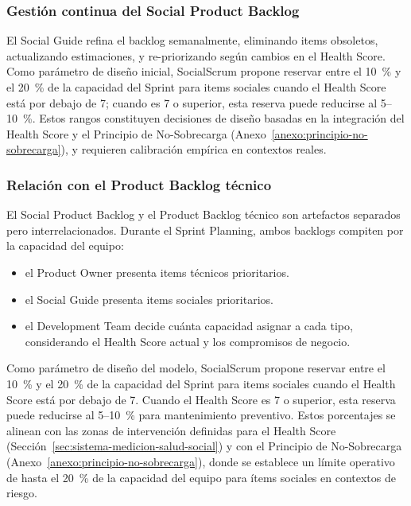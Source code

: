 \subsubsection{Gestión continua del Social Product Backlog}

El Social Guide refina el backlog semanalmente, eliminando items obsoletos, actualizando estimaciones, y re-priorizando según cambios en el Health Score. Como parámetro de diseño inicial, SocialScrum propone reservar entre el 10~\% y el 20~\% de la capacidad del Sprint para items sociales cuando el Health Score está por debajo de 7; cuando es 7 o superior, esta reserva puede reducirse al 5--10~\%. Estos rangos constituyen decisiones de diseño basadas en la integración del Health Score y el Principio de No-Sobrecarga (Anexo~\ref{anexo:principio-no-sobrecarga}), y requieren calibración empírica en contextos reales.

\subsubsection{Relación con el Product Backlog técnico}

El Social Product Backlog y el Product Backlog técnico son artefactos separados pero interrelacionados. Durante el Sprint Planning, ambos backlogs compiten por la capacidad del equipo:

\begin{itemize}
    \item el Product Owner presenta items técnicos prioritarios.
    \item el Social Guide presenta items sociales prioritarios.
    \item el Development Team decide cuánta capacidad asignar a cada tipo, considerando el Health Score actual y los compromisos de negocio.
\end{itemize}

Como parámetro de diseño del modelo, SocialScrum propone reservar entre el 10~\% y el 20~\% de la capacidad del Sprint para items sociales cuando el Health Score está por debajo de 7. Cuando el Health Score es 7 o superior, esta reserva puede reducirse al 5--10~\% para mantenimiento preventivo. Estos porcentajes se alinean con las zonas de intervención definidas para el Health Score (Sección~\ref{sec:sistema-medicion-salud-social}) y con el Principio de No-Sobrecarga (Anexo~\ref{anexo:principio-no-sobrecarga}), donde se establece un límite operativo de hasta el 20~\% de la capacidad del equipo para ítems sociales en contextos de riesgo.

